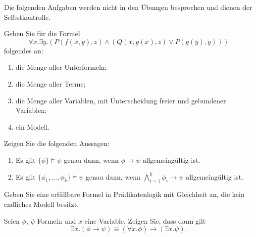 \documentclass[german]{latteachCD}[2017/03/28]
\begin{document}
\maketitle

\begin{mdframed}
  Die folgenden Aufgaben werden nicht in den Übungen besprochen und dienen der
  Selbstkontrolle.

  \renewcommand{\theexercise}{\Roman{exercise}}
  \setcounter{exercise}{0}

  \begin{exercise}
    Geben Sie für die Formel
    \begin{equation*}
      \forall x. \exists y. (P(f(x,y),z) \land (Q(x,g(x),z) \lor P(g(y),y)))
    \end{equation*}
    folgendes an:
    \begin{enumerate}
    \item die Menge aller Unterformeln;
    \item die Menge aller Terme;
    \item die Menge aller Variablen, mit Unterscheidung freier und gebundener
      Variablen;
    \item ein Modell.
    \end{enumerate}
  \end{exercise}

  \begin{exercise}
    Zeigen Sie die folgenden Aussagen:
    \begin{enumerate}
    \item Es gilt $\{\phi\} \models \psi$ genau dann, wenn $\phi \to \psi$
      allgemeingültig ist.
    \item Es gilt $\{\phi_{1}, \dots, \phi_{k}\} \models \psi$ genau dann, wenn
      $\bigwedge_{i=1}^{k} \phi_{i} \to \psi$ allgemeingültig ist.
    \end{enumerate}
  \end{exercise}

  \begin{exercise}
    Geben Sie eine erfüllbare Formel in Prädikatenlogik mit Gleichheit an, die
    kein endliches Modell besitzt.
  \end{exercise}

  \begin{exercise}
    Seien $\phi$, $\psi$ Formeln und $x$ eine Variable.  Zeigen Sie, dass dann gilt
    \begin{equation*}
      \exists x.(\phi \to \psi) \equiv (\forall x. \phi) \to (\exists x. \psi).
    \end{equation*}
  \end{exercise}
\end{mdframed}
\end{document}
